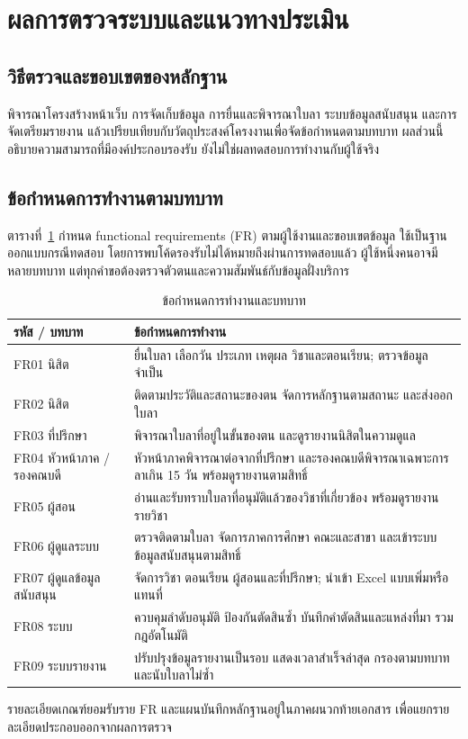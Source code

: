 \section{ผลการตรวจระบบและแนวทางประเมิน}
\subsection{วิธีตรวจและขอบเขตของหลักฐาน}
พิจารณาโครงสร้างหน้าเว็บ การจัดเก็บข้อมูล การยื่นและพิจารณาใบลา
ระบบข้อมูลสนับสนุน และการจัดเตรียมรายงาน
แล้วเปรียบเทียบกับวัตถุประสงค์โครงงานเพื่อจัดข้อกำหนดตามบทบาท
ผลส่วนนี้อธิบายความสามารถที่มีองค์ประกอบรองรับ
ยังไม่ใช่ผลทดสอบการทำงานกับผู้ใช้จริง
\subsection{ข้อกำหนดการทำงานตามบทบาท}
ตารางที่~\ref{tab:functional-role} กำหนด functional requirements (FR)
ตามผู้ใช้งานและขอบเขตข้อมูล ใช้เป็นฐานออกแบบกรณีทดสอบ
โดยการพบโค้ดรองรับไม่ได้หมายถึงผ่านการทดสอบแล้ว
ผู้ใช้หนึ่งคนอาจมีหลายบทบาท
แต่ทุกคำขอต้องตรวจตัวตนและความสัมพันธ์กับข้อมูลฝั่งบริการ
\begin{table}[H]
  \caption{ข้อกำหนดการทำงานและบทบาท}\label{tab:functional-role}
  \centering
  \begin{tabularx}{\columnwidth}{|p{23mm}|X|}
    \hline
    รหัส / บทบาท & ข้อกำหนดการทำงาน \\ \hline
    FR01 นิสิต & ยื่นใบลา เลือกวัน ประเภท เหตุผล วิชาและตอนเรียน;
    ตรวจข้อมูลจำเป็น \\ \hline
    FR02 นิสิต & ติดตามประวัติและสถานะของตน จัดการหลักฐานตามสถานะ
    และส่งออกใบลา \\ \hline
    FR03 ที่ปรึกษา & พิจารณาใบลาที่อยู่ในขั้นของตน
    และดูรายงานนิสิตในความดูแล \\ \hline
    FR04 หัวหน้าภาค / รองคณบดี & หัวหน้าภาคพิจารณาต่อจากที่ปรึกษา
    และรองคณบดีพิจารณาเฉพาะการลาเกิน 15 วัน พร้อมดูรายงานตามสิทธิ์ \\ \hline
    FR05 ผู้สอน &
    อ่านและรับทราบใบลาที่อนุมัติแล้วของวิชาที่เกี่ยวข้อง
    พร้อมดูรายงานรายวิชา \\ \hline
    FR06 ผู้ดูแลระบบ & ตรวจติดตามใบลา จัดการภาคการศึกษา คณะและสาขา
    และเข้าระบบข้อมูลสนับสนุนตามสิทธิ์ \\ \hline
    FR07 ผู้ดูแลข้อมูลสนับสนุน & จัดการวิชา ตอนเรียน
    ผู้สอนและที่ปรึกษา; นำเข้า Excel แบบเพิ่มหรือแทนที่ \\ \hline
    FR08 ระบบ & ควบคุมลำดับอนุมัติ ป้องกันตัดสินซ้ำ
    บันทึกคำตัดสินและแหล่งที่มา รวมกฎอัตโนมัติ \\ \hline
    FR09 ระบบรายงาน & ปรับปรุงข้อมูลรายงานเป็นรอบ
    แสดงเวลาสำเร็จล่าสุด กรองตามบทบาท และนับใบลาไม่ซ้ำ \\ \hline
  \end{tabularx}
\end{table}
รายละเอียดเกณฑ์ยอมรับราย FR
และแผนบันทึกหลักฐานอยู่ในภาคผนวกท้ายเอกสาร
เพื่อแยกรายละเอียดประกอบออกจากผลการตรวจ


